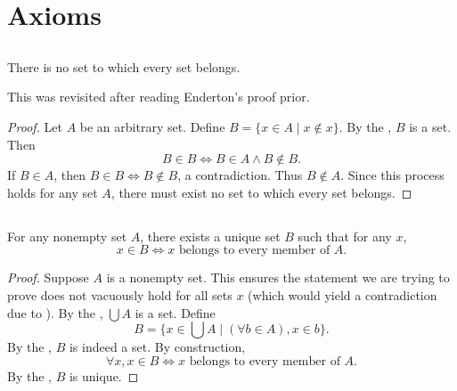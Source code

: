 \documentclass{report}
\begin{document}
\section{Axioms}%

\subsection{}%

  \begin{theorem}[2A]
    There is no set to which every set belongs.
  \end{theorem}

  \begin{note}
    This was revisited after reading Enderton's proof prior.
  \end{note}

  \begin{proof}
    Let $A$ be an arbitrary set.
    Define $B = \{ x \in A \mid x \not\in x \}$.
    By the , $B$ is a set.
    Then $$B \in B \iff B \in A \land B \not\in B.$$
    If $B \in A$, then $B \in B \iff B \not\in B$, a contradiction.
    Thus $B \not\in A$.
    Since this process holds for any set $A$, there must exist no set to which
      every set belongs.
  \end{proof}

\subsection{}%

  \begin{theorem}[2B]
    For any nonempty set $A$, there exists a unique set $B$ such that for any
      $x$, $$x \in B \iff x \text{ belongs to every member of } A.$$
  \end{theorem}

  \begin{proof}
    Suppose $A$ is a nonempty set.
    This ensures the statement we are trying to prove does not vacuously hold for
      all sets $x$ (which would yield a contradiction due to
      ).
    By the , $\bigcup A$ is a set.
    Define $$B = \{ x \in \bigcup A \mid (\forall b \in A), x \in b \}.$$
    By the , $B$ is indeed a set.
    By construction,
      $$\forall x, x \in B \iff x \text{ belongs to every member of } A.$$
    By the , $B$ is unique.
  \end{proof}
\end{document}
